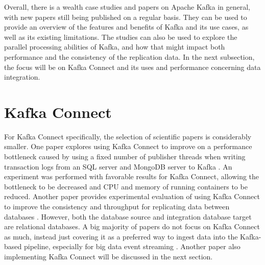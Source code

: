 Overall, there is a wealth case studies and papers on Apache Kafka in general, with new papers still being published on a regular basis. They can be used to provide an overview of the features and benefits of Kafka and its use cases, as well as its existing limitations. The studies can also be used to explore the parallel processing abilities of Kafka, and how that might impact both performance and the consistency of the replication data. In the next subsection, the focus will be on Kafka Connect and its uses and performance concerning data integration.

\section{Kafka Connect}
\label{ch03:litreview:kafkaconnect}
For Kafka Connect specifically, the selection of scientific papers is considerably smaller. One paper explores using Kafka Connect to improve on a performance bottleneck caused by using a fixed number of publisher threads when writing transaction logs from an SQL server and MongoDB server to Kafka \cite{srijithkafkaconnectperformance}. An experiment was performed with favorable results for Kafka Connect, allowing the bottleneck to be decreased and CPU and memory of running containers to be reduced. Another paper provides experimental evaluation of using Kafka Connect to improve the consistency and throughput for replicating data between databases \cite{adilaoptimizationkafkaconnect}. However, both the database source and integration database target are relational databases. A big majority of papers do not focus on Kafka Connect as much, instead just covering it as a preferred way to ingest data into the Kafka-based pipeline, especially for big data event streaming \cite{padmanabankafkabigdataeventstreaming}. Another paper also implementing Kafka Connect will be discussed in the next section.

